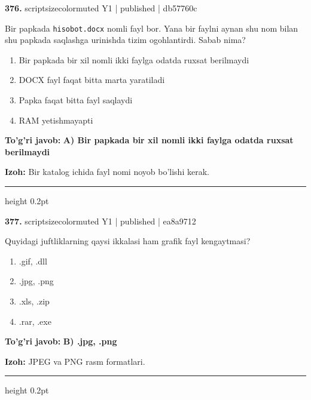 \documentclass[10pt,a4paper]{article}
\begin{document}
{\bfseries\sffamily\color{ink} 376.} {scriptsizecolor{muted} Y1 | published | db57760c}
\par
Bir papkada \texttt{hisobot.docx} nomli fayl bor. Yana bir faylni aynan shu nom bilan shu papkada saqlashga urinishda tizim ogohlantirdi. Sabab nima?
\begin{enumerate}[label=\Alph*),leftmargin=9mm]
\item Bir papkada bir xil nomli ikki faylga odatda ruxsat berilmaydi
\item DOCX fayl faqat bitta marta yaratiladi
\item Papka faqat bitta fayl saqlaydi
\item RAM yetishmayapti
\end{enumerate}
\begin{tcolorbox}[enhanced,breakable,colback=teal!4,colframe=teal!60!black,boxrule=0.45pt,arc=1.2mm,left=2.7mm,right=2.7mm,top=1.8mm,bottom=1.8mm,before skip=2mm,after skip=2mm]
{\bfseries\sffamily\color{teal}To'g'ri javob:} \textbf{A) Bir papkada bir xil nomli ikki faylga odatda ruxsat berilmaydi}
\par\smallskip
{\bfseries Izoh:} Bir katalog ichida fayl nomi noyob bo'lishi kerak.
\end{tcolorbox}
\vspace{2mm}\hrule height 0.2pt\vspace{3mm}

{\bfseries\sffamily\color{ink} 377.} {scriptsizecolor{muted} Y1 | published | ea8a9712}
\par
Quyidagi juftliklarning qaysi ikkalasi ham grafik fayl kengaytmasi?
\begin{enumerate}[label=\Alph*),leftmargin=9mm]
\item .gif, .dll
\item .jpg, .png
\item .xls, .zip
\item .rar, .exe
\end{enumerate}
\begin{tcolorbox}[enhanced,breakable,colback=teal!4,colframe=teal!60!black,boxrule=0.45pt,arc=1.2mm,left=2.7mm,right=2.7mm,top=1.8mm,bottom=1.8mm,before skip=2mm,after skip=2mm]
{\bfseries\sffamily\color{teal}To'g'ri javob:} \textbf{B) .jpg, .png}
\par\smallskip
{\bfseries Izoh:} JPEG va PNG rasm formatlari.
\end{tcolorbox}
\vspace{2mm}\hrule height 0.2pt\vspace{3mm}
\end{document}
